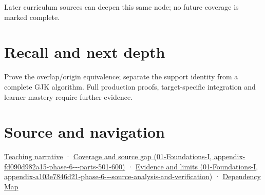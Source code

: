 Later curriculum sources can deepen this same node; no future coverage is marked complete.

\section{Recall and next depth}\label{appendix-215ac7099a82-recall-and-next-depth}

Prove the overlap/origin equivalence; separate the support identity from a complete GJK algorithm. Full production proofs, target-specific integration and learner mastery require further evidence.

\section{Source and navigation}\label{appendix-215ac7099a82-source-and-navigation}

\href{Continuous\%20Notes/Computing\%20Foundations\%20-\%20From\%20Bits\%20to\%20C++\%20and\%20Systems\%20APIs\#Weighted\%20points\%20lead\%20from\%20affine\%20geometry\%20to\%20collision\%20shapes}{Teaching narrative} · \href{../01-Foundations-I/main.pdf\#nameddest=appendix-fd090d982a15-phase-6---parts-501-600}{Coverage and source gap (01-Foundations-I, appendix-fd090d982a15-phase-6-\/-\/-parts-501-600)} · \href{../01-Foundations-I/main.pdf\#nameddest=appendix-a103e7846d21-phase-6---source-analysis-and-verification}{Evidence and limits (01-Foundations-I, appendix-a103e7846d21-phase-6-\/-\/-source-analysis-and-verification)} · \hyperref[appendix-4ad47bdd269a]{Dependency Map}
